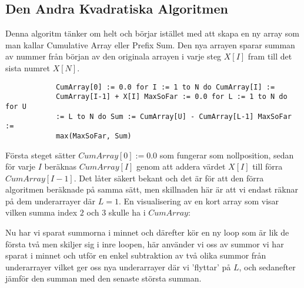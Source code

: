 \documentclass[a4paper,12pt]{article} \usepackage[swedish]{babel}
\begin{document}
            \subsection*{Den Andra Kvadratiska Algoritmen}
            \label{sec:kvadratisk2} Denna algoritm tänker om helt och
            börjar istället med att skapa en ny array som man kallar
            Cumulative Array eller Prefix Sum. Den nya arrayen sparar
            summan av nummer från början av den originala arrayen i varje
            steg $X[I]$ fram till det sista numret $X[N]$. \begin{verbatim}
            CumArray[0] := 0.0 for I := 1 to N do CumArray[I] :=
            CumArray[I-1] + X[I] MaxSoFar := 0.0 for L := 1 to N do for U
            := L to N do Sum := CumArray[U] - CumArray[L-1] MaxSoFar :=
            max(MaxSoFar, Sum) \end{verbatim} Första steget sätter
            $CumArray[0] := 0.0$ som fungerar som nollposition, sedan för
            varje $I$ beräknas $CumArray[I]$ genom att addera värdet $X[I]$
            till förra $CumArray[I - 1]$. Det låter säkert bekant och det
            är för att den förra algoritmen beräknade på samma sätt, men
            skillnaden här är att vi endast räknar på dem underarrayer där
            $L = 1$. En visualisering av en kort array som visar vilken
            summa index $2$ och $3$ skulle ha i $CumArray$: \begin{center}
                 \end{center} Nu har
                vi sparat summorna i minnet och därefter kör en ny loop som
                är lik de första två men skiljer sig i inre loopen, här
                använder vi oss av summor vi har sparat i minnet och utför
                en enkel subtraktion av två olika summor från underarrayer
                vilket ger oss nya underarrayer där vi 'flyttar' på $L$,
                och sedanefter jämför den summan med den senaste största
                summan.
\end{document}
